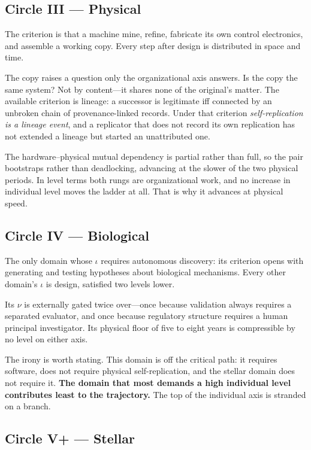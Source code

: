 \documentclass[11pt]{article}
\begin{document}
\subsection{Circle III --- Physical}

The criterion is that a machine mine, refine, fabricate its own control electronics, and assemble a working copy. Every step after design is distributed in space and time.

The copy raises a question only the organizational axis answers. Is the copy the same system? Not by content---it shares none of the original's matter. The available criterion is lineage: a successor is legitimate iff connected by an unbroken chain of provenance-linked records. Under that criterion \emph{self-replication is a lineage event}, and a replicator that does not record its own replication has not extended a lineage but started an unattributed one.

The hardware--physical mutual dependency is partial rather than full, so the pair bootstraps rather than deadlocking, advancing at the slower of the two physical periods. In level terms both rungs are organizational work, and no increase in individual level moves the ladder at all. That is why it advances at physical speed.

\subsection{Circle IV --- Biological}

The only domain whose $\iota$ requires autonomous discovery: its criterion opens with generating and testing hypotheses about biological mechanisms. Every other domain's $\iota$ is design, satisfied two levels lower.

Its $\nu$ is externally gated twice over---once because validation always requires a separated evaluator, and once because regulatory structure requires a human principal investigator. Its physical floor of five to eight years is compressible by no level on either axis.

The irony is worth stating. This domain is off the critical path: it requires software, does not require physical self-replication, and the stellar domain does not require it. \textbf{The domain that most demands a high individual level contributes least to the trajectory.} The top of the individual axis is stranded on a branch.

\subsection{Circle V+ --- Stellar}
\end{document}
